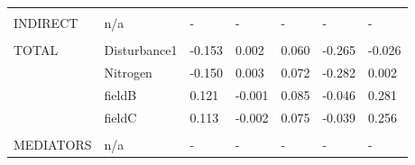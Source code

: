 \begin{longtable}[c]{l l l l l l l }
 & & & & & & \\
 INDIRECT & n/a & - & - & - & - & -\\
 & & & & & & \\
 TOTAL & Disturbance1 & -0.153 & 0.002 & 0.060 & -0.265 & -0.026\\
 & Nitrogen & -0.150 & 0.003 & 0.072 & -0.282 & 0.002\\
 & fieldB & 0.121 & -0.001 & 0.085 & -0.046 & 0.281\\
 & fieldC & 0.113 & -0.002 & 0.075 & -0.039 & 0.256\\
 & & & & & & \\
 MEDIATORS &n/a & - & - & - & - & -\\
\end{longtable}
